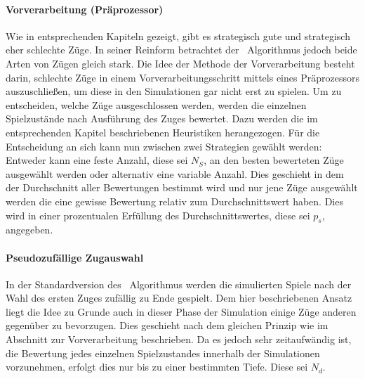 \paragraph{Vorverarbeitung (Präprozessor)}
Wie in entsprechenden Kapiteln gezeigt, gibt es strategisch gute und strategisch eher schlechte Züge. In seiner Reinform betrachtet der \mc\ Algorithmus jedoch beide Arten von Zügen gleich stark. Die Idee der Methode der Vorverarbeitung besteht darin, schlechte Züge in einem Vorverarbeitungsschritt mittels eines Präprozessors auszuschließen, um diese in den Simulationen gar nicht erst zu spielen. Um zu entscheiden, welche Züge ausgeschlossen werden, werden die einzelnen Spielzustände nach Ausführung des Zuges bewertet. Dazu werden die im entsprechenden Kapitel beschriebenen Heuristiken herangezogen. Für die Entscheidung an sich kann nun zwischen zwei Strategien gewählt werden:\\
Entweder kann eine feste Anzahl, diese sei $N_{S}$, an den besten bewerteten Züge ausgewählt werden oder alternativ eine variable Anzahl. Dies geschieht in dem der Durchschnitt aller Bewertungen bestimmt wird und nur jene Züge ausgewählt werden die eine gewisse Bewertung relativ zum Durchschnittswert haben. Dies wird in einer prozentualen Erfüllung des Durchschnittswertes, diese sei $p_{s}$, angegeben.
\paragraph{Pseudozufällige Zugauswahl}
\label{Pseudornd-move-selection}
In der Standardversion des \mc\ Algorithmus werden die simulierten Spiele nach der Wahl des ersten Zuges zufällig zu Ende gespielt. Dem hier beschriebenen Ansatz liegt die Idee zu Grunde auch in dieser Phase der Simulation einige Züge anderen gegenüber zu bevorzugen. Dies geschieht nach dem gleichen Prinzip wie im Abschnitt zur Vorverarbeitung beschrieben. Da es jedoch sehr zeitaufwändig ist, die Bewertung jedes einzelnen Spielzustandes innerhalb der Simulationen vorzunehmen, erfolgt dies nur bis zu einer bestimmten Tiefe. Diese sei $N_{d}$.
